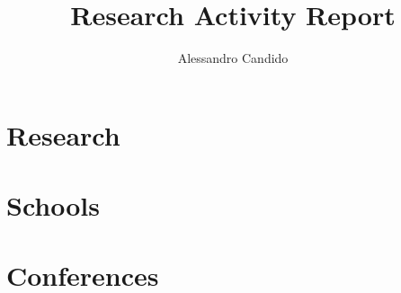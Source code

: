 \documentclass[a4paper,11pt,twocolumn]{article}
\title{Research Activity Report}
\author{Alessandro Candido}
\begin{document}
 
\notoc
\maketitle

\section{Research}
\label{sec:research}


\section{Schools}
\label{sec:schools}


\section{Conferences}
\label{sec:conferences}


\end{document}

